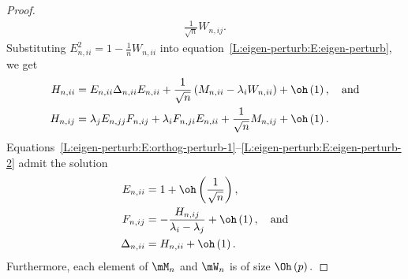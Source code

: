 \begin{proof}
\begin{subequations}
\begin{align}
         \frac{1}{\sqrt{n}} W_{n,ij}.
         \label{L:eigen-perturb:E:orthog-perturb-2}
\end{align}
\end{subequations}
Substituting
\(
    E_{n,ii}^2 = 1 - \frac{1}{n} W_{n,ii}
\)
into equation~\eqref{L:eigen-perturb:E:eigen-perturb}, we get
\begin{subequations}
\begin{align}
    H_{n,ii} 
        &= E_{n,ii} \Delta_{n,ii} E_{n,ii}
           + 
           \frac{1}{\sqrt{n}} \left(
                M_{n,ii} - \lambda_i W_{n,ii}
           \right)
           +
           \oh \left( 1 \right), \quad \text{and} 
           \label{L:eigen-perturb:E:eigen-perturb-1} \\
    H_{n,ij}
        &= \lambda_j E_{n,jj} F_{n,ij}
           +
           \lambda_i F_{n,ji} E_{n,ii} 
           +
           \frac{1}{\sqrt{n}} M_{n,ij}
           +
           \oh \left( 1 \right).
           \label{L:eigen-perturb:E:eigen-perturb-2} 
\end{align}
\end{subequations}
Equations~\eqref{L:eigen-perturb:E:orthog-perturb-1}--\eqref{L:eigen-perturb:E:eigen-perturb-2} admit the solution
\begin{subequations}
\begin{align}
    E_{n,ii} 
        &= 1 + \oh\left(\frac{1}{\sqrt{n}}\right), \\
    F_{n,ij}
        &= -
           \frac{ H_{n,ij} }
                { \lambda_i - \lambda_j }
           +
           \oh \left( 1 \right), \quad \text{and} \\
    \Delta_{n,ii}
        &= H_{n,ii} + \oh\left( 1 \right).
\end{align}
\end{subequations}
Furthermore, each element of $\mM_n$ and $\mW_n$ is of size
\(
    \Oh\left( p \right).
\)
\end{proof}

